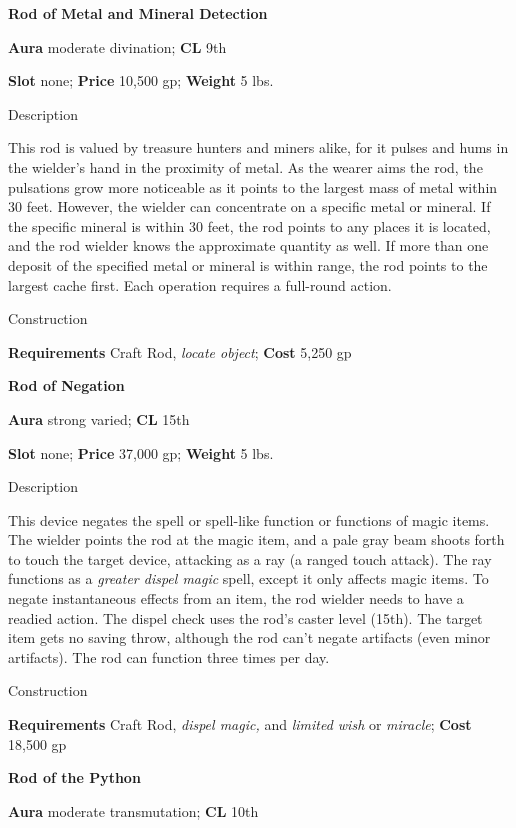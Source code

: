 \textbf{Rod of Metal and Mineral Detection}
				
\textbf{Aura} moderate divination;\textbf{ CL }9th
				
\textbf{Slot} none; \textbf{Price} 10,500 gp; \textbf{Weight} 5 lbs.
				
Description
				
This rod is valued by treasure hunters and miners alike, for it pulses and hums in the wielder's hand in the proximity of metal. As the wearer aims the rod, the pulsations grow more noticeable as it points to the largest mass of metal within 30 feet. However, the wielder can concentrate on a specific metal or mineral. If the specific mineral is within 30 feet, the rod points to any places it is located, and the rod wielder knows the approximate quantity as well. If more than one deposit of the specified metal or mineral is within range, the rod points to the largest cache first. Each operation requires a full-round action. 
				
Construction
				
\textbf{Requirements} Craft Rod, \textit{locate object}; \textbf{Cost }5,250 gp
				
\textbf{Rod of Negation}
				
\textbf{Aura} strong varied;\textbf{ CL }15th
				
\textbf{Slot} none; \textbf{Price} 37,000 gp; \textbf{Weight} 5 lbs.
				
Description
				
This device negates the spell or spell-like function or functions of magic items. The wielder points the rod at the magic item, and a pale gray beam shoots forth to touch the target device, attacking as a ray (a ranged touch attack). The ray functions as a \textit{greater dispel magic }spell, except it only affects magic items. To negate instantaneous effects from an item, the rod wielder needs to have a readied action. The dispel check uses the rod's caster level (15th). The target item gets no saving throw, although the rod 
can't
 negate artifacts (even minor artifacts). The rod can function three times per day. 
				
Construction
				
\textbf{Requirements} Craft Rod, \textit{dispel magic,} and \textit{limited wish} or \textit{miracle}; \textbf{Cost }18,500 gp
				
\textbf{Rod of the Python}
				
\textbf{Aura} moderate transmutation;\textbf{ CL }10th
				
